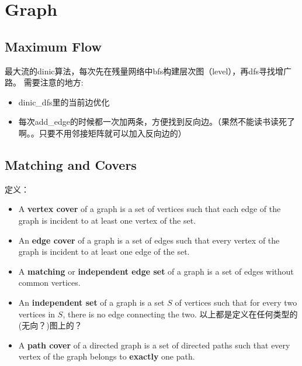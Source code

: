 \documentclass[twoside, UTF8]{article}
\begin{document}
	\section{Graph}
		\subsection{Maximum Flow}
			\begin{flushleft}
				最大流的dinic算法，每次先在残量网络中bfs构建层次图（level），再dfs寻找增广路。
				\linebreak 需要注意的地方:
				\begin{itemize}
					\item dinic\_dfs里的当前边优化
					\item 每次add\_edge的时候都一次加两条，方便找到反向边。（果然不能读书读死了啊。。只要不用邻接矩阵就可以加入反向边的）
				\end{itemize}
			\end{flushleft}
			
			
		\newpage
		\subsection{Matching and Covers}
			\begin{flushleft}
				定义：
				\begin{itemize}
					\item A \textbf{vertex cover} of a graph is a set of vertices such that each edge of the graph is incident to at least one vertex of the set.
					\item An \textbf{edge cover} of a graph is a set of edges such that every vertex of the graph is incident to at least one edge of the set.
					\item A \textbf{matching} or \textbf{independent edge set} of a graph is a set of edges without common vertices.
					\item An \textbf{independent set} of a graph is a set $S$ of vertices such that for every two vertices in $S$, there is no edge connecting the two.
					\linebreak 以上都是定义在任何类型的{\tiny (无向？)}图上的？
					\item A \textbf{path cover} of a directed graph is a set of directed paths such that every vertex of the graph belongs to \textbf{exactly} one path.
				\end{itemize}
			\end{flushleft}
		
\end{document}
